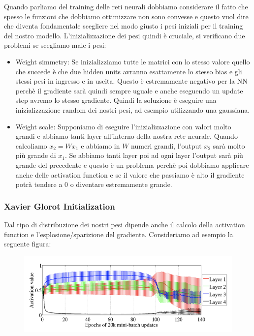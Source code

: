 \documentclass[14pt]{extreport}
\begin{document}
Quando parliamo del training delle reti neurali dobbiamo considerare il fatto che spesso le funzioni che dobbiamo ottimizzare non sono convesse e questo vuol dire che 
diventa fondamentale scegliere nel modo giusto i pesi iniziali per il training del nostro modello.
L'inizializzazione dei pesi quindi è cruciale, si verificano due problemi se scegliamo male i pesi:
\begin{itemize}
\item Weight simmetry: Se inizializziamo tutte le matrici con lo stesso valore quello che succede è che due hidden units avranno esattamente lo stesso bias e gli stessi pesi in ingresso e in uscita.
Questo è estremamente negativo per la NN perchè il gradiente sarà quindi sempre uguale e anche eseguendo un update step avremo lo stesso gradiente. Quindi la soluzione è eseguire una inizializzazione random dei nostri 
pesi, ad esempio utilizzando una gaussiana.
\item Weight scale: Supponiamo di eseguire l'inizializzazione con valori molto grandi e abbiamo tanti layer all'interno della nostra rete neurale.
Quando calcoliamo $x_2 = Wx_1$ e abbiamo in $W$ numeri grandi, l'output $x_2$ sarà molto più grande di $x_1$.
Se abbiamo tanti layer poi ad ogni layer l'output sarà più grande del precedente e questo è un problema perchè poi dobbiamo applicare anche delle activation function e se il valore che passiamo è alto
il gradiente potrà tendere a 0 o diventare estremamente grande.
\end{itemize}

\subsubsection{Xavier Glorot Initialization}

Dal tipo di distribuzione dei nostri pesi dipende anche il calcolo della activation function e l'esplosione/sparizione del gradiente.
Consideriamo ad esempio la seguente figura:

\begin{figure}[H]
	\centering
	\includegraphics[width=0.7\linewidth]{423.jpeg}
	\end{figure}
\end{document}
